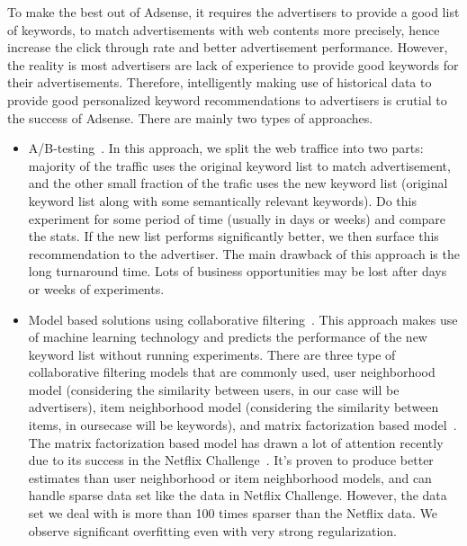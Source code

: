 To make the best out of Adsense, it requires the advertisers to
provide a good list of keywords, to match advertisements with web
contents more precisely, hence increase the click through rate and
better advertisement performance. However, the reality is most
advertisers are lack of experience to provide good keywords for their
advertisements. Therefore, intelligently making use of historical data
to provide good personalized keyword recommendations to advertisers is
crutial to the success of Adsense. There are mainly two types of
approaches.
\begin{itemize}
\item A/B-testing~\cite{abtest:wiki}. In this approach, we split the
  web traffice into two parts: majority of the traffic uses the
  original keyword list to match advertisement, and the other small
  fraction of the trafic uses the new keyword list (original keyword
  list along with some semantically relevant keywords). Do this
  experiment for some period of time (usually in days or weeks) and
  compare the stats. If the new list performs significantly better, we
  then surface this recommendation to the advertiser. The main
  drawback of this approach is the long turnaround time. Lots of
  business opportunities may be lost after days or weeks of
  experiments.
\item Model based solutions using collaborative
  filtering~\cite{resnick1997recommender,sarwar2001item}. This
  approach makes use of machine learning technology and predicts the
  performance of the new keyword list without running
  experiments. There are three type of collaborative filtering models
  that are commonly used, user neighborhood model (considering the
  similarity between users, in our case will be advertisers), item
  neighborhood model (considering the similarity between items, in
  oursecase will be keywords), and matrix factorization based
  model~\cite{}. The matrix factorization based model has drawn a lot
  of attention recently due to its success in the Netflix
  Challenge~\cite{}. It's proven to produce better estimates than user
  neighborhood or item neighborhood models, and can handle sparse data
  set like the data in Netflix Challenge. However, the data set we
  deal with is more than 100 times sparser than the Netflix data. We
  observe significant overfitting even with very strong
  regularization.
\end{itemize}

